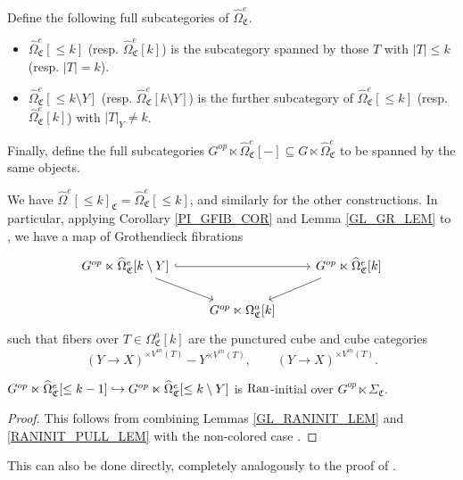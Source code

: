 \documentclass[a4paper,10pt
,draft
]{article}%
\renewcommand{\hat}{\widehat}
\renewcommand{\1}{\eta}%
\newcommand{\SC}{\Sigma_{\mathfrak C}}
\begin{document}
\begin{definition}
      Define the following full subcategories of $\hat\Omega_{\mathfrak C}^e$.
      \begin{itemize}
      \item $\hat\Omega_{\mathfrak C}^e[\leq k]$ (resp. $\hat\Omega_{\mathfrak C}^e[k]$) is the subcategory spanned by
            those $T$ with $|T| \leq k$ (resp. $|T| = k$).
      \item $\hat\Omega_{\mathfrak C}^e[\leq k \setminus Y]$ (resp. $\hat\Omega_{\mathfrak C}^e[k \setminus Y]$) is the further subcategory of $\hat\Omega_{\mathfrak C}^e[\leq k]$ (resp. $\hat\Omega_{\mathfrak C}^e[k]$) with $|T|_Y \neq k$.
      \end{itemize}

      Finally, define the full subcategories
      $G^{op} \ltimes \hat \Omega_{\mathfrak C}^e[-] \subseteq G \ltimes \hat \Omega_{\mathfrak C}^e$
      to be spanned by the same objects.
\end{definition}

\begin{remark}
      \label{OEFIB_REM}
      We have $\hat\Omega^e[\leq k]_{\mathfrak C} = \hat\Omega_{\mathfrak C}^e[\leq k]$, and similarly for the other constructions.
      In particular, applying Corollary \ref{PI_GFIB_COR} and Lemma \ref{GL_GR_LEM} to \cite[Remark 5.57]{BP_geo}, we have a map of Grothendieck fibrations
      \begin{equation}
            \begin{tikzcd}
                  G^{op} \ltimes \hat\Omega_{\mathfrak C}^e[k \setminus Y] \arrow[rr, hookrightarrow] \arrow[dr]
                  &&
                  G^{op} \ltimes \hat\Omega_{\mathfrak C}^e[k] \arrow[dl]
                  \\
                  &
                  G^{op} \ltimes \Omega_{\mathfrak C}^a[k]
            \end{tikzcd}
      \end{equation}
      such that fibers over $T \in \Omega_{\mathfrak C}^a[k]$ are the punctured cube and cube categories
      \begin{equation}
            (Y \to X)^{\times V^{in}(T)} - Y^{\times V^{in}(T)},
            \qquad
            (Y \to X)^{\times V^{in}(T)}.
      \end{equation}
\end{remark}

\begin{lemma}
      \label{LANINT_LEM}
      $G^{op} \ltimes \hat\Omega_{\mathfrak C}^e[\leq k-1] \into G^{op} \ltimes \hat\Omega_{\mathfrak C}^e[\leq k \setminus Y]$
      is $\operatorname{Ran}$-initial over $G^{op} \ltimes \SC$.
\end{lemma}
\begin{proof}
      This follows from combining Lemmas \ref{GL_RANINIT_LEM} and \ref{RANINIT_PULL_LEM} with the non-colored case \cite[Lemma 5.58]{BP_geo}.
\end{proof}
\begin{remark}
      This can also be done directly, completely analogously to the proof of \cite[Lemma 5.58]{BP_geo}.
\end{remark}
\end{document}
